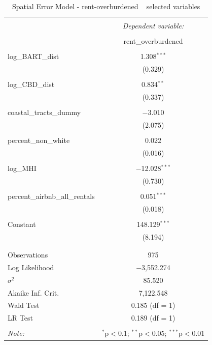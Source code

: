 \documentclass[10pt, letterpaper]{amsart}
\begin{document}
\begin{table}[!htbp] \centering 
  \caption{Spatial Error Model - rent-overburdened ~ selected variables} 
  \label{} 
  \begin{tabular}{@{\extracolsep{5pt}}lc} 
    \\[-1.8ex]\hline 
    \hline \\[-1.8ex] 
    & \multicolumn{1}{c}{\textit{Dependent variable:}} \\ 
    \cline{2-2} 
    \\[-1.8ex] & rent\_overburdened \\ 
    \hline \\[-1.8ex] 
    log\_BART\_dist & 1.308$^{***}$ \\ 
    & (0.329) \\ 
    & \\ 
    log\_CBD\_dist & 0.834$^{**}$ \\ 
    & (0.337) \\ 
    & \\ 
    coastal\_tracts\_dummy & $-$3.010 \\ 
    & (2.075) \\ 
    & \\ 
    percent\_non\_white & 0.022 \\ 
    & (0.016) \\ 
    & \\ 
    log\_MHI & $-$12.028$^{***}$ \\ 
    & (0.730) \\ 
    & \\ 
    percent\_airbnb\_all\_rentals & 0.051$^{***}$ \\ 
    & (0.018) \\ 
    & \\ 
    Constant & 148.129$^{***}$ \\ 
    & (8.194) \\ 
    & \\ 
    \hline \\[-1.8ex] 
    Observations & 975 \\ 
    Log Likelihood & $-$3,552.274 \\ 
    $\sigma^{2}$ & 85.520 \\ 
    Akaike Inf. Crit. & 7,122.548 \\ 
    Wald Test & 0.185 (df = 1) \\ 
    LR Test & 0.189 (df = 1) \\ 
    \hline 
    \hline \\[-1.8ex] 
    \textit{Note:}  & \multicolumn{1}{r}{$^{*}$p$<$0.1; $^{**}$p$<$0.05; $^{***}$p$<$0.01} \\ 
  \end{tabular} 
\end{table} 
\end{document}
